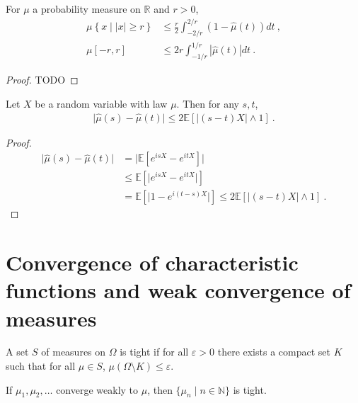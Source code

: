 \begin{lemma}\label{lem:charFun_bound}
For $\mu$ a probability measure on $\mathbb{R}$ and $r > 0$,
\begin{align*}
\mu \left\{x \mid |x| \ge r\right\}
&\le \frac{r}{2} \int_{-2/r}^{2/r} (1 - \hat{\mu}(t))dt
\: , \\
\mu [-r, r]
&\le 2 r \int_{-1/r}^{1/r} |\hat{\mu}(t)| dt
\: .
\end{align*}
\end{lemma}

\begin{proof}
TODO
\end{proof}

\begin{lemma}\label{lem:abs_sub_charFun}
Let $X$ be a random variable with law $\mu$. Then for any $s, t$,
\begin{align*}
\vert \hat{\mu}(s) - \hat{\mu}(t) \vert
\le 2 \mathbb{E}\left[ \left\vert (s - t) X\right\vert \wedge 1\right]
\: .
\end{align*}
\end{lemma}

\begin{proof}
\begin{align*}
\vert \hat{\mu}(s) - \hat{\mu}(t) \vert
&= \vert \mathbb{E}\left[e^{isX} - e^{itX}\right] \vert
\\
&\le \mathbb{E}\left[\vert e^{isX} - e^{itX} \vert\right]
\\
&= \mathbb{E}\left[\vert 1 - e^{i(t - s)X} \vert\right]
\le 2 \mathbb{E}\left[ \left\vert (s - t) X\right\vert \wedge 1\right]
\: .
\end{align*}
\end{proof}

\section{Convergence of characteristic functions and weak convergence of measures}


\begin{definition}\label{def:tight}
A set $S$ of measures on $\Omega$ is tight if for all $\varepsilon > 0$ there exists a compact set $K$ such that for all $\mu \in S$, $\mu(\Omega \setminus K) \le \varepsilon$.
\end{definition}

\begin{lemma}\label{lem:tight_of_cvg}
If $\mu_1, \mu_2, \ldots$ converge weakly to $\mu$, then $\{\mu_n \mid n \in \mathbb{N}\}$ is tight.
\end{lemma}

